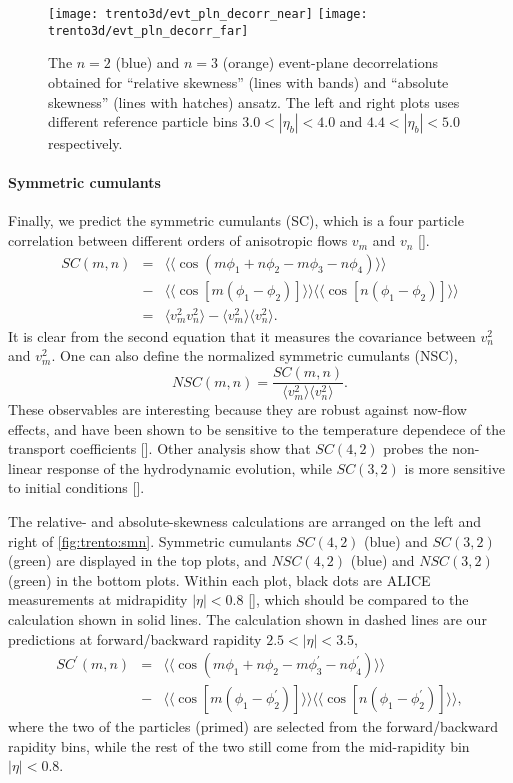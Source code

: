 \begin{figure}
\centering
\texttt{[image: trento3d/evt\_pln\_decorr\_near]}
\hfill
\texttt{[image: trento3d/evt\_pln\_decorr\_far]}
\caption{The $n=2$ (blue) and $n=3$ (orange) event-plane decorrelations obtained for ``relative skewness'' (lines with bands) and ``absolute skewness'' (lines with hatches) ansatz. The left and right plots uses different reference particle bins $3.0<|\eta_b|<4.0$ and $4.4<|\eta_b|<5.0$ respectively.}
\label{fig:trento:epd}
\end{figure}

\paragraph{Symmetric cumulants} Finally, we predict the symmetric cumulants (SC), which is a four particle correlation between different orders of anisotropic flows $v_m$ and $v_n$ [].
\begin{eqnarray}
SC(m, n) &=& \langle\langle \cos(m\phi_1+n\phi_2-m\phi_3-n\phi_4)\rangle\rangle \nonumber \\
\nonumber &-& \langle\langle\cos[m(\phi_1-\phi_2)]\rangle\rangle\langle\langle\cos[n(\phi_1-\phi_2)]\rangle\rangle \label{eq:scmn}\\
&=& \langle v_m^2 v_n^2 \rangle - \langle v_m^2\rangle\langle v_n^2\rangle.
\end{eqnarray}
It is clear from the second equation that it measures the covariance between $v_n^2$ and $v_m^2$.
One can also define the normalized symmetric cumulants (NSC),
\begin{equation}
NSC(m,n) = \frac{SC(m,n)}{\langle v_m^2\rangle\langle v_n^2\rangle}.
\end{equation}
These observables are interesting because they are robust against now-flow effects, and have been shown to be sensitive to the temperature dependece of the transport coefficients [].
Other analysis show that $SC(4,2)$ probes the non-linear response of the hydrodynamic evolution, while $SC(3,2)$ is more sensitive to initial conditions [].

The relative- and absolute-skewness calculations are arranged on the left and right of \ref{fig:trento:smn}. 
Symmetric cumulants $SC(4,2)$ (blue) and $SC(3,2)$ (green) are displayed in the top plots, and $NSC(4,2)$ (blue) and $NSC(3,2)$ (green) in the bottom plots.
Within each plot, black dots are ALICE measurements at midrapidity $|\eta|<0.8$ [], which should be compared to the calculation shown in solid lines.
The calculation shown in dashed lines are our predictions at forward/backward rapidity $2.5 < |\eta| < 3.5$,
\begin{eqnarray}
SC^\prime(m, n) &=& \langle\langle \cos(m\phi_1+n\phi_2-m\phi_3^\prime-n\phi_4^\prime)\rangle\rangle \\
\nonumber &-& \langle\langle\cos[m(\phi_1-\phi_2^\prime)]\rangle\rangle\langle\langle\cos[n(\phi_1-\phi_2^\prime)]\rangle\rangle, \label{eq:scmn}
\end{eqnarray}
where the two of the particles (primed) are selected from the forward/backward rapidity bins, while the rest of the two still come from the mid-rapidity bin $|\eta|<0.8$.

